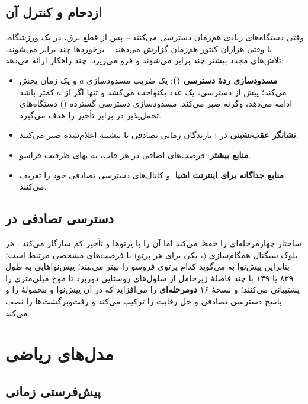 \documentclass[11pt,a4paper]{article}
\begin{document}
\subsection{ازدحام  و کنترل آن}
وقتی دستگاه‌های زیادی هم‌زمان دسترسی می‌کنند -- پس از قطع برق، در یک ورزشگاه، یا وقتی هزاران کنتور هم‌زمان
گزارش می‌دهند -- برخوردها چند برابر می‌شوند، تلاش‌های مجدد بیشتر چند برابر می‌شوند و  فرو می‌ریزد.
 چند راهکار ارائه می‌دهد:
\begin{itemize}
  \item \textbf{مسدودسازی ردهٔ دسترسی ()}:  یک ضریب مسدودسازی $a$ و یک زمان پخش می‌کند؛ پیش
        از دسترسی،  یک عدد یکنواخت می‌کشد و تنها اگر از $a$ کمتر باشد ادامه می‌دهد، وگرنه صبر می‌کند.
        مسدودسازی دسترسی گسترده () دستگاه‌های تحمل‌پذیر در برابر تأخیر را هدف می‌گیرد.
  \item \textbf{نشانگر عقب‌نشینی} در : بازندگان زمانی تصادفی تا بیشینهٔ اعلام‌شده صبر می‌کنند.
  \item \textbf{منابع  بیشتر}: فرصت‌های  اضافی در هر قاب، به بهای ظرفیت فراسو.
  \item \textbf{منابع جداگانه برای اینترنت اشیا}:  و  کانال‌های دسترسی تصادفی خود را تعریف می‌کنند.
\end{itemize}

\subsection{دسترسی تصادفی در }
 ساختار چهارمرحله‌ای را حفظ می‌کند اما آن را با پرتوها و تأخیر کم سازگار می‌کند \cite{ts38300}: هر بلوک
سیگنال همگام‌سازی (، یکی برای هر پرتو) با فرصت‌های  مشخصی مرتبط است؛ بنابراین پیش‌نوا به
 می‌گوید  کدام پرتوی فروسو را بهتر می‌بیند؛ پیش‌نواهایی به طول ۸۳۹ یا ۱۳۹ با چند فاصلهٔ زیرحامل
از سلول‌های روستایی دوربرد تا موج میلی‌متری را پشتیبانی می‌کنند؛ و نسخهٔ ۱۶ \textbf{ دومرحله‌ای} را
می‌افزاید که در آن  پیش‌نوا و محمولهٔ  را و  پاسخ دسترسی تصادفی و حل رقابت را ترکیب
می‌کند و رفت‌وبرگشت‌ها را نصف می‌کند.

\section{مدل‌های ریاضی}

\subsection{پیش‌فرستی زمانی}\label{sec:ta}
\end{document}
